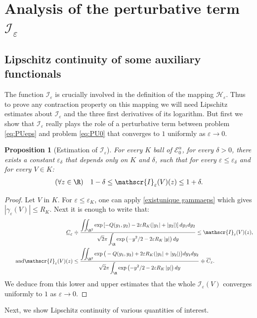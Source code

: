 \documentclass[JEP,XML,SOM,Unicode]{cedram}
\let\mathcal\mathscr
\newcommand{\cI}{\mathcal{I}}
\theoremstyle{plain}
\newtheorem{prop}[thm]{Proposition}
\theoremstyle{definition}
\renewcommand{\H}{\mathcal{H}_\eps}
\let\eps\varepsilon
\let\ds\displaystyle
\newcommand{\abs}[1]{\left\lvert#1\right\rvert}
\newcommand{\Eaz}{\mathcal{E}^\alpha_0}
\newcommand{\RK}{R_K}
\begin{document}
\section{Analysis of the perturbative term \texorpdfstring{$\cI_\eps$}{Ie}}\label{sec prop Ieps}
\subsection{Lipschitz continuity of some auxiliary functionals}\label{sec reg prop Ieps}\label{sec regprop Ieps}
The function $\cI_\eps$ is crucially involved in the definition of the mapping $\H$. Thus to prove any contraction property on this mapping we will need Lipschitz estimates about $\cI_\eps$ and the three first derivatives of its logarithm. But first we show that $\cI_\eps$ really plays the role of a perturbative term between problem \eqref{eq:PUeps} and problem \eqref{eq:PU0} that converges to $1$ uniformly as $\eps\to0$.

\begin{prop}[Estimation of $\cI_\eps$]\label{estim Ieps}
For every $K$ ball of $\Eaz$, for every $\delta>0$, there exists a constant $\eps_\delta$ that depends only on $K$ and $\delta$, such that for every $\eps \leq \eps_\delta$ and for every $V \in K$:
\begin{align*}
(\forall z\in \R)\quad 1-\delta \leq \cI_\eps(V)(z) \leq 1+\delta.
\end{align*}
\end{prop}
\begin{proof}
Let $V$ in $K$. For $\eps\leq\eps_K$, one can apply \cref{existunique gammaeps} which gives \hbox{$\abs{\gamma_\eps(V)}\leq\RK$}. Next it is enough to write that:
\begin{align*}
\underline{C}_\eps &\doteqdot \dfrac{\ds \iint_{\R^2} \exp\left[-Q(y_1,y_2) - 2 \eps R_K (\abs{y_1}+\abs{y_2}) \right]d y_1 d y_2 }{\ds\sqrt{2 } \pi \int_\R \exp\left(- y^2/2 - 2 \eps R_K \abs{y} \right) d y} \leq \cI_\eps(V)(z),\\
\tag*{and}
\cI_\eps(V)(z) &\leq \dfrac{\ds \iint_{\R^2} \exp\big(-Q(y_1,y_2) + 2 \eps R_K(\abs{y_1}+\abs{y_2}) 	 \big)d y_1 d y_2 }{\ds\sqrt{2 } \pi \int_\R \exp\left(- y^2/2 - 2 \eps R_K \abs{y} \right) d y} \doteqdot \overline{C}_\eps.
\end{align*}
We deduce from this lower and upper estimates that the whole $\cI_\eps(V)$ converges uniformly to $1$ as $\eps \to 0$.
\end{proof}

Next, we show Lipschitz continuity of various quantities of interest.
\end{document}
